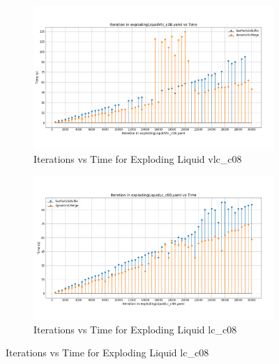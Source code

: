\section{}
\begin{figure}[H]
\centering
\begin{subfigure}{\linewidth}
    \centering
    \includegraphics[width=\linewidth]{graphs/explodingLiquid/normalExperiments/iter/vlcc08.png}
    \caption{Iterations vs Time for Exploding Liquid vlc\_c08}
    \label{fig:fallingDrop}
\end{subfigure}

\begin{subfigure}{\linewidth}
    \centering
    \includegraphics[width=\linewidth]{graphs/explodingLiquid/normalExperiments/iter/lcc08.png}
    \caption{Iterations vs Time for Exploding Liquid lc\_c08}
    \label{fig:explodingLiquid}
\end{subfigure}

\label{fig:appendixGraphs}
\end{figure}

